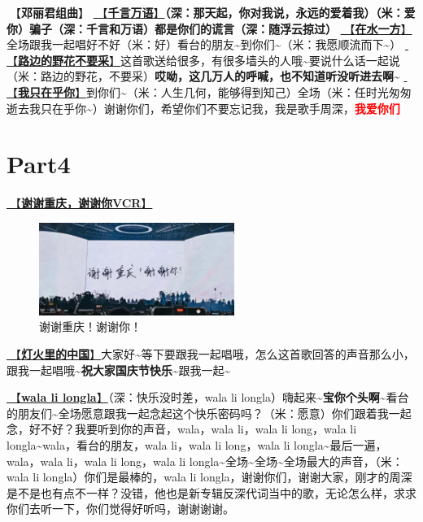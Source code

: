 \documentclass[]{ctexbook}
\begin{document}
🎵【\textbf{邓丽君组曲}】
\hyperref[thousands-of-words]{🎵【\textbf{千言万语}】}\textbf{（深：那天起，你对我说，永远的爱着我）（米：爱你）骗子（深：千言和万语）都是你们的谎言（深：随浮云掠过）} \hyperref[on-the-water-side]{🎵【\textbf{在水一方}】}全场跟我一起唱好不好（米：好）看台的朋友\textasciitilde 到你们\textasciitilde（米：我愿顺流而下\textasciitilde）
\hyperref[only-with-me]{🎵【\textbf{路边的野花不要采}】}这首歌送给很多，有很多墙头的人哦\textasciitilde 要说什么话一起说（米：路边的野花，不要采）\textbf{哎呦，这几万人的呼喊，也不知道听没听进去啊\textasciitilde{}}
\hyperref[only-you]{🎵【\textbf{我只在乎你}】}到你们\textasciitilde（米：人生几何，能够得到知己）全场（米：任时光匆匆逝去我只在乎你\textasciitilde）谢谢你们，希望你们不要忘记我，我是歌手周深，\textbf{\textcolor{red}{我爱你们~} }

\section{Part4}\label{chongqing-20241006-part4}

\hyperref[thank-you-vcr]{🎥【\textbf{谢谢重庆，谢谢你VCR}】}

\begin{figure}

{\centering \includegraphics[width=180pt]{img/chongqing20241006/thank-chongqing} 

}

\caption{谢谢重庆！谢谢你！}\label{fig:unnamed-chunk-104}
\end{figure}

\hyperref[China-in-the-light]{🎵【\textbf{灯火里的中国}】}大家好\textasciitilde 等下要跟我一起唱哦，怎么这首歌回答的声音那么小，跟我一起唱哦\textasciitilde{}\textbf{祝大家国庆节快乐\textasciitilde{}}跟我一起\textasciitilde{}

\hyperref[wala-li-longla]{🎵【\textbf{wala li longla}】}（深：快乐没时差，wala li longla）嗨起来\textasciitilde{}\textbf{宝你个头啊\textasciitilde{}}看台的朋友们\textasciitilde 全场愿意跟我一起念起这个快乐密码吗？（米：愿意）你们跟着我一起念，好不好？我要听到你的声音，wala，wala li，wala li long，wala li longla\textasciitilde wala，看台的朋友，wala li，wala li long，wala li longla\textasciitilde 最后一遍，wala，wala li，wala li long，wala li longla\textasciitilde 全场\textasciitilde 全场\textasciitilde 全场最大的声音，（米：wala li longla）你们是最棒的，wala li longla，谢谢你们，谢谢大家，刚才的周深是不是也有点不一样？没错，他也是新专辑反深代词当中的歌，无论怎么样，求求你们去听一下，你们觉得好听吗，谢谢谢谢。
\end{document}
